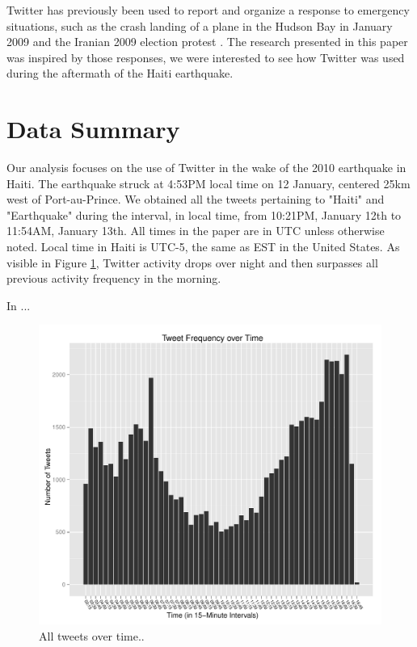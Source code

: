 \documentclass[a4paper, 11pt, titlepage]{article}
\begin{document}
Twitter has previously been used to report and organize a response to emergency situations, such as the crash landing of a plane in the Hudson Bay in January 2009 \cite{Deards2009} and the Iranian 2009 election protest \cite{Grossman2009}.  The research presented in this paper was inspired by those responses, we were interested to see how Twitter was used during the aftermath of the Haiti earthquake.

\section{Data Summary}
Our analysis focuses on the use of Twitter in the wake of the 2010 earthquake in Haiti. The earthquake struck at 4:53PM local time on 12 January, centered 25km west of Port-au-Prince. We obtained all the tweets pertaining to "Haiti" and "Earthquake" during the interval, in local time, from 10:21PM, January 12th to 11:54AM, January 13th.  All times in the paper are in UTC unless otherwise noted.  Local time in Haiti is UTC-5, the same as EST in the United States.  As visible in Figure \ref{fig:all_tweets_over_time}, Twitter activity drops over night and then surpasses all previous activity frequency in the morning.


In \cite{Deards2009} ...

\begin{figure}[h]
\centering
\label{fig:all_tweets_over_time}
\includegraphics[width=120mm]{../figures/all_tweets_over_time}
\caption{All tweets over time..}
\end{figure}
\end{document}
